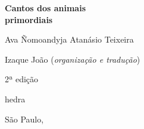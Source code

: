 




\begingroup\thispagestyle{empty}\vspace*{.05\textheight} 

              {\formular
              \huge
              \noindent
              \textbf{Cantos dos animais\\primordiais}\\
                
              \vspace{-0.5cm}
              
              }

              \vspace{1cm}
              
              {\formular\Large
              \noindent{}Ava Ñomoandyja Atanásio Teixeira
              }

              \vfill              

              {\small
              \noindent{}Izaque João (\textit{organização e tradução})
              }

              \vspace{0.5cm}

              {\small\noindent{}2ª edição}

              \vfill
              \newfontfamily{}
              {\noindent\fontsize{30}{40}\selectfont\timesnewroman hedra}

              {\small\timesnewroman\noindent São Paulo, \the\year}

\endgroup
\pagebreak
